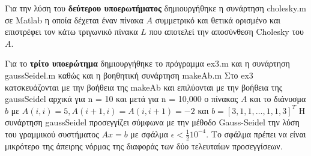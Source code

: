 \documentclass[a4paper,11pt]{article}
\begin{document}
\begin{flushleft}
Για την λύση του \textbf{δεύτερου υποερωτήματος} δημιουργήθηκε η συνάρτηση cholesky.m σε Matlab η οποία δέχεται έναν πίνακα $A$ συμμετρικό και θετικά ορισμένο και επιστρέφει τον κάτω τριγωνικό πίνακα $L$ που αποτελεί την αποσύνθεση Cholesky του $A$.
\linebreak

Για το \textbf{τρίτο υποερώτημα} δημιουργήθηκε το πρόγραμμα ex3.m και η συνάρτηση gaussSeidel.m καθώς και η βοηθητική συνάρτηση makeAb.m
\linebreak
Στο ex3 κατσκευάζονται με την βοήθεια της makeAb και επιλύονται με την βοήθεια της gaussSeidel αρχικά για n = 10 και μετά για n = 10,000 ο πίνακας $A$ και το διάνυσμα $b$ με $A(i,i) = 5, A(i+1,i) = A(i,i+1) = -2$ και $b = [3,1,1,\dots,1,1,3]^T$
\linebreak
Η συνάρτηση gaussSeidel προσεγγίζει σύμφωνα με την μέθοδο Gauss-Seidel την λύση του γραμμικού συστήματος $Ax=b$ με σφάλμα $\epsilon < \frac{1}{2}10^{-4}$.
Το σφάλμα πρέπει να είναι μικρότερο της άπειρης νόρμας της διαφοράς των δύο τελευταίων προσεγγίσεων.
\end{flushleft}
\end{document}
